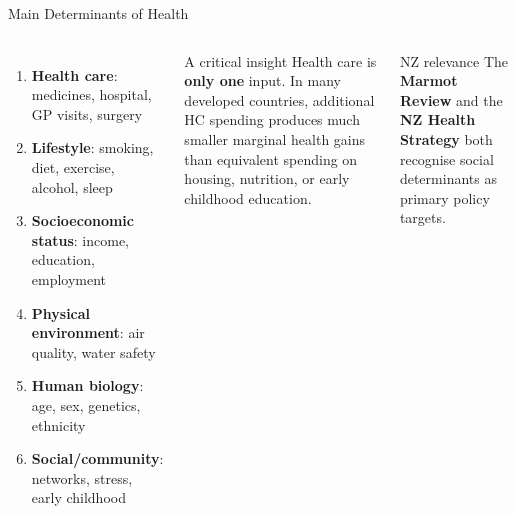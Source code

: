 \documentclass[aspectratio=169, 12pt]{beamer}
\begin{document}
\begin{frame}{Main Determinants of Health}
  \begin{columns}
      \small
      \begin{enumerate}
        \item \textbf{Health care}: medicines, hospital, GP visits, surgery
        \item \textbf{Lifestyle}: smoking, diet, exercise, alcohol, sleep
        \item \textbf{Socioeconomic status}: income, education, employment
        \item \textbf{Physical environment}: air quality, water safety
        \item \textbf{Human biology}: age, sex, genetics, ethnicity
        \item \textbf{Social/community}: networks, stress, early childhood
      \end{enumerate}
      \begin{alertblock}{A critical insight}
        \small Health care is \textbf{only one} input. In many developed countries, additional
        HC spending produces much smaller marginal health gains than equivalent spending on
        housing, nutrition, or early childhood education.
      \end{alertblock}
      \vspace{0.2em}
      \begin{exampleblock}{NZ relevance}
        \small The \textbf{Marmot Review} and the \textbf{NZ Health Strategy} both recognise
        social determinants as primary policy targets.
      \end{exampleblock}
  \end{columns}
\end{frame}
\end{document}
